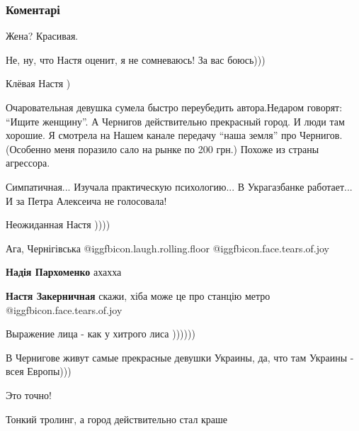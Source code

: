  
 
 
 
 
\subsubsection{Коментарі}
\label{sec:03_12_2021.fb.lesev_igor.1.chernigov.cmt}

\begin{itemize} %
Жена? Красивая.

Не, ну, что Настя оценит, я не сомневаюсь!
За вас боюсь)))

Клёвая Настя )


Очаровательная девушка сумела быстро переубедить автора.Недаром говорят: \enquote{Ищите
женщину}. А Чернигов действительно прекрасный город. И люди там хорошие. Я
смотрела на Нашем канале передачу \enquote{наша земля} про Чернигов. (Особенно меня
поразило сало на рынке по 200 грн.) Похоже из страны агрессора.

Симпатичная... Изучала практическую психологию... В Украгазбанке работает... И за Петра Алексеича не голосовала!

Неожиданная Настя ))))

Ага, Чернігівська  @igg{fbicon.laugh.rolling.floor}  @igg{fbicon.face.tears.of.joy} 

\begin{itemize} %
\textbf{Надія Пархоменко} ахахха

\textbf{Настя Закерничная} скажи, хіба може це про станцію метро  @igg{fbicon.face.tears.of.joy} 
\end{itemize} %

Выражение лица - как у хитрого лиса ))))))

В Чернигове живут самые прекрасные девушки Украины, да, что там Украины - всея Европы)))

Это точно!

Тонкий тролинг, а город действительно стал краше


\end{itemize}
